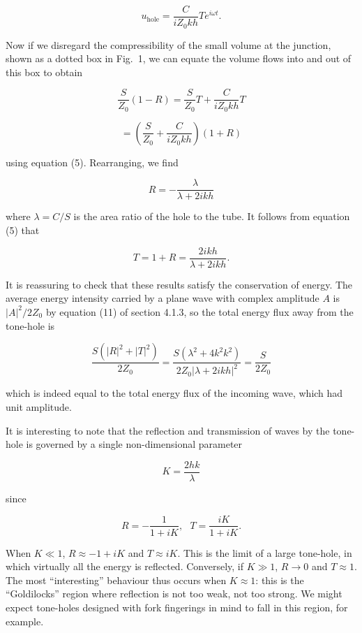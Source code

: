   $$u_{\mathrm{hole}}=\dfrac{C}{iZ_0 kh}T e^{i \omega t} . \tag{7}$$ 

  Now if we disregard the compressibility of the small volume at the junction, 
  shown as a dotted box in Fig.\ 1, we can equate the volume flows into and out 
  of this box to obtain 

  $$\dfrac{S}{Z_0}(1-R)=\dfrac{S}{Z_0}T +\dfrac{C}{iZ_0 kh}T \tag{8}$$ 

  $$=\left(\dfrac{S}{Z_0}+\dfrac{C}{iZ_0 kh} \right) (1+R) \tag{9}$$ 

  using equation (5). Rearranging, we find 

  $$R=-\dfrac{\lambda}{\lambda+2ikh} \tag{10}$$ 

  where $\lambda=C/S$ is the area ratio of the hole to the tube. It follows 
  from equation (5) that 

  $$T=1+R = \dfrac{2ikh}{\lambda+2ikh} . \tag{11}$$ 

  It is reassuring to check that these results satisfy the conservation of 
  energy. The average energy intensity carried by a plane wave with complex 
  amplitude $A$ is $|A|^2/2Z_0$ by equation (11) of section 4.1.3, so the total 
  energy flux away from the tone-hole is 

  $$\dfrac{S(|R|^2 + |T|^2)}{2Z_0} = \dfrac{S(\lambda^2+ 
  4k^2k^2)}{2Z_0|\lambda+2ikh|^2} = \dfrac{S}{2Z_0} \tag{12}$$ 

  which is indeed equal to the total energy flux of the incoming wave, which 
  had unit amplitude. 

  It is interesting to note that the reflection and transmission of waves by 
  the tone-hole is governed by a single non-dimensional parameter 

  $$K=\dfrac{2hk}{\lambda} \tag{13}$$ 

  since 

  $$R=-\dfrac{1}{1+iK}, \mathrm{~~~}T=\dfrac{iK}{1+iK} . \tag{14}$$ 

  When $K \ll 1$, $R \approx -1+iK$ and $T \approx iK$. This is the limit of a 
  large tone-hole, in which virtually all the energy is reflected. Conversely, 
  if $K \gg 1$, $R \rightarrow 0$ and $T \approx 1$. The most ``interesting'' 
  behaviour thus occurs when $K \approx 1$: this is the ``Goldilocks'' region 
  where reflection is not too weak, not too strong. We might expect tone-holes 
  designed with fork fingerings in mind to fall in this region, for example. 